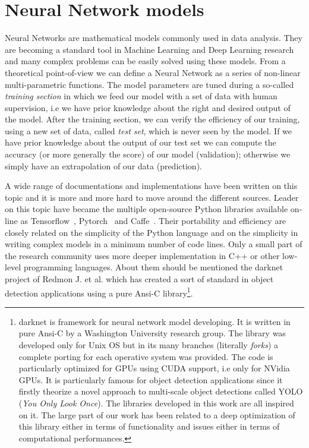 \documentclass{standalone}
\begin{document}
\section[Neural Network models]{Neural Network models}\label{NN:nn}

Neural Networks are mathematical models commonly used in data analysis.
They are becoming a standard tool in Machine Learning and Deep Learning research and many complex problems can be easily solved using these models.
From a theoretical point-of-view we can define a Neural Network as a series of non-linear multi-parametric functions.
The model parameters are tuned during a so-called \emph{training section} in which we feed our model with a set of data with human supervision, i.e we have prior knowledge about the right and desired output of the model.
After the training section, we can verify the efficiency of our training, using a new set of data, called \emph{test set}, which is never seen by the model.
If we have prior knowledge about the output of our test set we can compute the accuracy (or more generally the score) of our model (validation); otherwise we simply have an extrapolation of our data (prediction).

A wide range of documentations and implementations have been written on this topic and it is more and more hard to move around the different sources.
Leader on this topic have became the multiple open-source \textsf{Python} libraries available on-line as \textsf{Tensorflow}~\cite{tensorflow2015-whitepaper}, \textsf{Pytorch}~\cite{paszke2017automatic} and \textsf{Caffe}~\cite{Jia:2014:Caffe}.
Their portability and efficiency are closely related on the simplicity of the \textsf{Python} language and on the simplicity in writing complex models in a minimum number of code lines.
Only a small part of the research community uses more deeper implementation in \textsf{C++} or other low-level programming languages.
About them should be mentioned the \textsf{darknet project} of Redmon J. et al. which has created a sort of standard in object detection applications using a pure \textsf{Ansi-C} library\footnote{
  \textsf{darknet} is framework for neural network model developing.
  It is written in pure \textsf{Ansi-C} by a Washington University research group.
  The library was developed only for Unix OS but in its many branches (literally \emph{forks}) a complete porting for each operative system was provided.
  The code is particularly optimized for GPUs using CUDA support, i.e only for NVidia GPUs.
  It is particularly famous for object detection applications since it firstly theorize a novel approach to multi-scale object detections called YOLO (\emph{You Only Look Once}).
  The libraries developed in this work are all inspired on it.
  The large part of our work has been related to a deep optimization of this library either in terms of functionality and issues either in terms of computational performances.
}.
\end{document}
